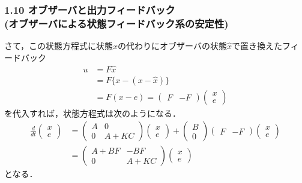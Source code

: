 \documentclass[10pt]{beamer}
\begin{document}
\begin{frame}[t]
\frametitle{1.10 オブザーバと出力フィードバック \\
(オブザーバによる状態フィードバック系の安定性)}
さて，この状態方程式に状態$x$の代わりにオブザーバの状態$\hat{x}$で置き換えたフィードバック
\begin{align}
 u &= F \hat{x}
\nonumber \\
   &= F \{x - (x-\hat{x})\}
\nonumber \\
   &= F (x - e)
    = \left( \begin{array}{cc} F & -F \end{array} \right)
      \left( \begin{array}{c}
               x \\
               e
             \end{array} \right)
\end{align}
を代入すれば，状態方程式は次のようになる．
\begin{align}
 \frac{d}{dt}
  \left(\begin{array}{c}
         x \\
   e
  \end{array}\right)
  &=
  \left(\begin{array}{cc}
         A & 0 \\
   0 & A+KC
  \end{array}\right)
  \left(\begin{array}{c}
         x \\
   e
  \end{array}\right)
  +
  \left(\begin{array}{c}
         B \\
   0
  \end{array}\right)
  \left( \begin{array}{cc} F & -F \end{array} \right)
  \left( \begin{array}{c}
               x \\
               e
         \end{array} \right)
\nonumber \\
 &=
 \left(\begin{array}{cc}
        A + BF & -BF \\
  0 & A + KC
       \end{array}\right)
 \left(\begin{array}{c}
         x \\
   e
       \end{array}\right)
\end{align}
となる．
\end{frame}
\end{document}
